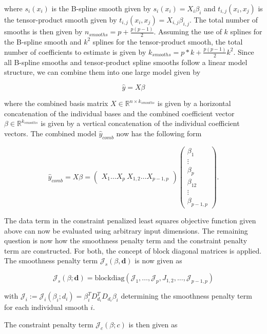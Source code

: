 \documentclass[10pt,a4paper]{article}
\begin{document}
	where $s_i(x_i)$ is the B-spline smooth given by $s_i(x_i) = X_i \beta_i$ and $t_{i, j}(x_i,x_j)$ is the tensor-product smooth given by $t_{i, j}(x_i,x_j) = X_{i,j} \beta_{i,j}$. The total number of smooths is then given by $n_{smooths} = p + \frac{p(p-1)}{2}$.  Assuming the use of $k$ splines for the B-spline smooth and $k^2$ splines for the tensor-product smooth, the total number of coefficients to estimate is given by $k_{smooths} = p*k + \frac{p(p-1)}{2}k^2$. Since all B-spline smooths and tensor-product spline smooths follow a linear model structure, we can combine them into one large model given by
	
	$$\hat y = X \beta$$
	
	where the combined basis matrix $X \in \mathbb{R}^{n \times k_{smooths}}$ is given by a horizontal concatenation of the individual bases and the combined coefficient vector $\beta \in \mathbb{R}^{k_{smooths}}$ is given by a vertical concatenation of the individual coefficient vectors. The combined model $\hat y_{comb}$ now has the following form
		
	$$\hat y_{comb} = X \beta = \begin{pmatrix} X_1 \dots X_p \ X_{1,2} \dots X_{p-1,p}\end{pmatrix} \begin{pmatrix} \beta_1 \\ \vdots \\ \beta_p \\ \beta_{12} \\ \vdots \\ \beta_{p-1, p}  \end{pmatrix}.$$
	
	The data term in the constraint penalized least squares objective function given above can now be evaluated using arbitrary input dimensions. The remaining question is now how the smoothness penalty term and the constraint penalty term are constructed. For both, the concept of block diagonal matrices is applied. The smoothness penalty term $\mathcal J_s(\beta, \mathbf d)$ is now given as
	
	$$\mathcal J_s(\beta; \mathbf d) = \text{blockdiag}(\mathcal J_1, \dots, \mathcal J_p, J_{1,2}, \dots, \mathcal J_{p-1,p}) $$
	
	with $\mathcal J_i := \mathcal J_i(\beta_i; d_i) = \beta_i^T D_{d_i}^T D_{d_i} \beta_i$ determining the smoothness penalty term for each individual smooth $i$. 
	
	The constraint penalty term $\mathcal J_c(\beta; c)$ is then given as
	
\end{document}
